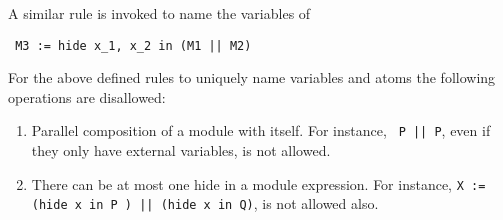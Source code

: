 A similar rule is invoked to name the variables of 

\mypar
\begin{verbatim}
 M3 := hide x_1, x_2 in (M1 || M2)
\end{verbatim}

For the above defined rules to uniquely name variables and atoms the
following operations are disallowed:
\begin{enumerate}
\item Parallel composition of a module with itself. For instance, {\tt
P || P}, even if they only have external variables, is not allowed.  
\item There can be at most one hide in a module expression. For
instance, {\tt X := (hide x in P ) || (hide x in Q)}, is not allowed
also. 
\end{enumerate}
